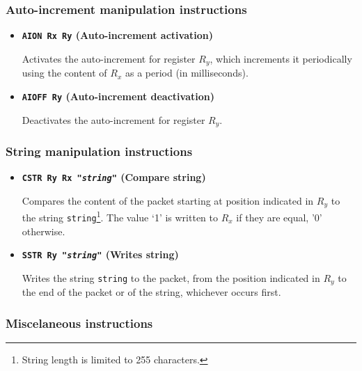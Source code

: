 \documentclass[11pt]{article}
\begin{document}
\subsubsection{Auto-increment manipulation instructions}


\begin{itemize}

\item \textbf{\texttt{AION Rx Ry} (Auto-increment activation)} 


Activates the auto-increment for register $R_y$, which increments it periodically using the content of $R_x$ as a period (in milliseconds).

\item \textbf{\texttt{AIOFF Ry} (Auto-increment deactivation)} 

Deactivates the auto-increment for register $R_y$.

\end{itemize}

\subsubsection{String manipulation instructions}


\begin{itemize}

\item \textbf{\texttt{CSTR Ry Rx "{\em string}"} (Compare string)} 


Compares the content of the packet starting at position indicated in $R_y$ to the string \texttt{string}\footnote{String length is limited to 255 characters.}. The value `1' is written to $R_x$ if they are equal, '0' otherwise.

\item \textbf{\texttt{SSTR Ry "{\em string}"} (Writes string)}


Writes the string \texttt{string} to the packet, from the position indicated in $R_y$ to the end of the packet or of the string, whichever occurs first.

\end{itemize}

\subsubsection{Miscelaneous instructions}
\end{document}
